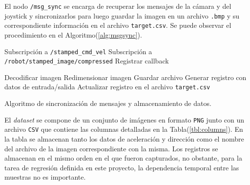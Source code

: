     El nodo \lstinline{/msg_sync} se encarga de recuperar los mensajes de la cámara y del joystick y sincronizarlos para luego 
    guardar la imagen en un archivo \lstinline{.bmp} y su correspondiente información en el archivo \lstinline{target.csv}. 
    Se puede observar el procedimiento en el Algoritmo(\ref{alg:msgsync}).

    \begin{algorithm}
        \begin{algorithmic}[1]
        \STATE Subscripción a \lstinline{/stamped_cmd_vel}
        \STATE Subscripción a \lstinline{/robot/stamped_image/compressed}
        \STATE Registrar callback
        
            \LOOP
                \STATE Decodificar imagen
                \STATE Redimensionar imagen
                \STATE Guardar archivo
                \STATE Generar registro con datos de entrada/salida
                \STATE Actualizar registro en el archivo \lstinline{target.csv}
            \ENDIF
            \ENDLOOP
        \ENDWHILE
        \end{algorithmic}
        \caption{Algoritmo de sincronización de mensajes y almacenamiento de datos.}\label{alg:msgsync}
    \end{algorithm}

    El \textit{dataset} se compone de un conjunto de imágenes en formato \lstinline{PNG} junto con un archivo \lstinline{CSV} que 
    contiene las columnas detalladas en la Tabla(\ref{tbl:columns}). En la tabla se almacenan tanto los datos de aceleración y dirección como el 
    nombre del archivo de la imagen correspondiente con la misma. Los registros se almacenan en el mismo orden en el que fueron 
    capturados, no obstante, para la tarea de regresión definida en este proyecto, la dependencia temporal entre las muestras 
    no es importante. 

